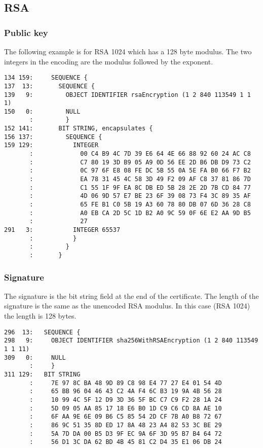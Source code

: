 \documentclass[12pt]{article}
\begin{document}
\newpage
\subsection{RSA}

\subsubsection{Public key}

\noindent
The following example is for RSA 1024 which has a 128 byte modulus.
The two integers in the encoding are the modulus followed by the exponent.

\begin{verbatim}
134 159:     SEQUENCE {
137  13:       SEQUENCE {
139   9:         OBJECT IDENTIFIER rsaEncryption (1 2 840 113549 1 1 1)
150   0:         NULL
       :         }
152 141:       BIT STRING, encapsulates {
156 137:         SEQUENCE {
159 129:           INTEGER
       :             00 C4 B9 4C 7D 39 E6 64 4E 66 88 92 60 24 AC C8
       :             C7 80 19 3D B9 05 A9 0D 56 EE 2D B6 DB D9 73 C2
       :             0C 97 6F E8 08 FE DC 5B 55 0A 5E FA B0 66 F7 B2
       :             EA 78 31 45 4C 58 3D 49 F2 09 AF C8 37 81 86 7D
       :             C1 55 1F 9F EA 8C DB ED 5B 28 2E 2D 7B CD 84 77
       :             4D 06 9D 57 E7 BE 23 6F 39 08 73 F4 3C 89 35 AF
       :             65 FE B1 C0 5B 19 A3 60 78 80 DB 07 6D 36 28 C8
       :             A0 EB CA 2D 5C 1D B2 A0 9C 59 0F 6E E2 AA 9D B5
       :             27
291   3:           INTEGER 65537
       :           }
       :         }
       :       }
\end{verbatim}

\subsubsection{Signature}

\noindent
The signature is the bit string field at the end of the certificate.
The length of the signature is the same as the unencoded RSA modulus.
In this case (RSA 1024) the length is 128 bytes.

\begin{verbatim}
296  13:   SEQUENCE {
298   9:     OBJECT IDENTIFIER sha256WithRSAEncryption (1 2 840 113549 1 1 11)
309   0:     NULL
       :     }
311 129:   BIT STRING
       :     7E 97 8C BA 48 9D 89 C8 98 E4 77 27 E4 01 54 4D
       :     65 BB 96 04 46 43 C2 4A F4 6C B3 19 9A 4B 56 28
       :     10 99 4C 5F 12 D9 3D 36 5F BC C7 C9 F2 28 1A 24
       :     5D 09 05 AA 85 17 18 E6 B0 1D C9 C6 CD 8A AE 10
       :     6F AA 9E 6E 09 B6 C5 85 54 2D CF 7B A0 B8 72 67
       :     86 9C 51 35 8D ED 17 8A 48 23 A4 82 53 3C BE 29
       :     5A 7D DA 00 B5 D3 9F EC 9A 6F 3D 95 B7 B4 64 72
       :     56 D1 3C DA 62 BD 4B 45 81 C2 D4 35 E1 06 DB 24
\end{verbatim}
\end{document}
